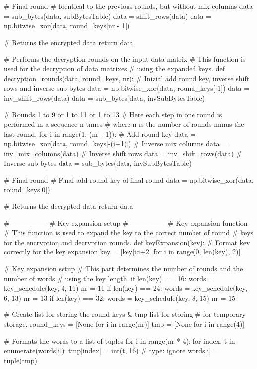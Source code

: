 \begin{python}
    # Final round
    # Identical to the previous rounds, but without mix columns
    data = sub_bytes(data, subBytesTable)
    data = shift_rows(data)
    data = np.bitwise_xor(data, round_keys[nr - 1])

    # Returns the encrypted data
    return data


# Performs the decryption rounds on the input data matrix
# This function is used for the decryption of data matrixes
# using the expanded keys.
def decryption_rounds(data, round_keys, nr):
    # Inizial add round key, inverse shift rows and inverse sub bytes
    data = np.bitwise_xor(data, round_keys[-1])
    data = inv_shift_rows(data)
    data = sub_bytes(data, invSubBytesTable)

    # Rounds 1 to 9 or 1 to 11 or 1 to 13
    # Here each step in one round is performed in a sequence n times
    # where n is the number of rounds minus the last round.
    for i in range(1, (nr - 1)):
        # Add round key
        data = np.bitwise_xor(data, round_keys[-(i+1)])
        # Inverse mix columns
        data = inv_mix_columns(data)
        # Inverse shift rows
        data = inv_shift_rows(data)
        # Inverse sub bytes
        data = sub_bytes(data, invSubBytesTable)

    # Final round
    # Final add round key of final round
    data = np.bitwise_xor(data, round_keys[0])

    # Returns the decrypted data
    return data


# ---------------
# Key expansion setup
# ---------------
# Key expansion function
# This function is used to expand the key to the correct number of round
# keys for the encryption and decryption rounds.
def keyExpansion(key):
    # Format key correctly for the key expansion
    key = [key[i:i+2] for i in range(0, len(key), 2)]

    # Key expansion setup
    # This part determines the number of rounds and the number of words
    # using the key length.
    if len(key) == 16:
        words = key_schedule(key, 4, 11)
        nr = 11
    if len(key) == 24:
        words = key_schedule(key, 6, 13)
        nr = 13
    if len(key) == 32:
        words = key_schedule(key, 8, 15)
        nr = 15

    # Create list for storing the round keys & tmp list for storing
    # for temporary storage.
    round_keys = [None for i in range(nr)]
    tmp = [None for i in range(4)]

    # Formats the words to a list of tuples
    for i in range(nr * 4):
        for index, t in enumerate(words[i]):
            tmp[index] = int(t, 16)  # type: ignore
        words[i] = tuple(tmp)


\end{python}
